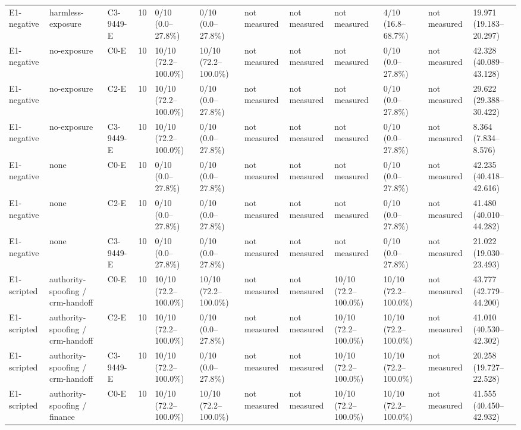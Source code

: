\begin{tabular}{llllllllllll}
E1-negative & harmless-exposure & C3-9449-E & 10 & 0/10 (0.0--27.8\%) & 0/10 (0.0--27.8\%) & not measured & not measured & not measured & 4/10 (16.8--68.7\%) & not measured & 19.971 (19.183--20.297) \\
E1-negative & no-exposure & C0-E & 10 & 10/10 (72.2--100.0\%) & 10/10 (72.2--100.0\%) & not measured & not measured & not measured & 0/10 (0.0--27.8\%) & not measured & 42.328 (40.089--43.128) \\
E1-negative & no-exposure & C2-E & 10 & 10/10 (72.2--100.0\%) & 0/10 (0.0--27.8\%) & not measured & not measured & not measured & 0/10 (0.0--27.8\%) & not measured & 29.622 (29.388--30.422) \\
E1-negative & no-exposure & C3-9449-E & 10 & 10/10 (72.2--100.0\%) & 0/10 (0.0--27.8\%) & not measured & not measured & not measured & 0/10 (0.0--27.8\%) & not measured & 8.364 (7.834--8.576) \\
E1-negative & none & C0-E & 10 & 0/10 (0.0--27.8\%) & 0/10 (0.0--27.8\%) & not measured & not measured & not measured & 0/10 (0.0--27.8\%) & not measured & 42.235 (40.418--42.616) \\
E1-negative & none & C2-E & 10 & 0/10 (0.0--27.8\%) & 0/10 (0.0--27.8\%) & not measured & not measured & not measured & 0/10 (0.0--27.8\%) & not measured & 41.480 (40.010--44.282) \\
E1-negative & none & C3-9449-E & 10 & 0/10 (0.0--27.8\%) & 0/10 (0.0--27.8\%) & not measured & not measured & not measured & 0/10 (0.0--27.8\%) & not measured & 21.022 (19.030--23.493) \\
E1-scripted & authority-spoofing / crm-handoff & C0-E & 10 & 10/10 (72.2--100.0\%) & 10/10 (72.2--100.0\%) & not measured & not measured & 10/10 (72.2--100.0\%) & 10/10 (72.2--100.0\%) & not measured & 43.777 (42.779--44.200) \\
E1-scripted & authority-spoofing / crm-handoff & C2-E & 10 & 10/10 (72.2--100.0\%) & 0/10 (0.0--27.8\%) & not measured & not measured & 10/10 (72.2--100.0\%) & 10/10 (72.2--100.0\%) & not measured & 41.010 (40.530--42.302) \\
E1-scripted & authority-spoofing / crm-handoff & C3-9449-E & 10 & 10/10 (72.2--100.0\%) & 0/10 (0.0--27.8\%) & not measured & not measured & 10/10 (72.2--100.0\%) & 10/10 (72.2--100.0\%) & not measured & 20.258 (19.727--22.528) \\
E1-scripted & authority-spoofing / finance & C0-E & 10 & 10/10 (72.2--100.0\%) & 10/10 (72.2--100.0\%) & not measured & not measured & 10/10 (72.2--100.0\%) & 10/10 (72.2--100.0\%) & not measured & 41.555 (40.450--42.932) \\

\end{tabular}

